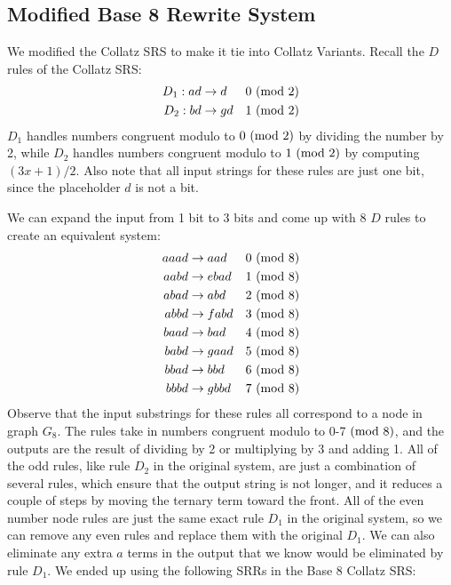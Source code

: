 \subsection{Modified Base 8 Rewrite System} \label{subsec:base8rewrite}
We modified the Collatz SRS to make it tie into Collatz Variants. Recall the $D$ rules of the Collatz SRS:
\begin{align*}
    D_1: ad &\rightarrow d &\text{$0\ (\mathrm{mod}\ 2)$}\\
    D_2: bd &\rightarrow gd &\text{$1\ (\mathrm{mod}\ 2)$}\\
\end{align*}
$D_1$ handles numbers congruent modulo to $0 \ (\mathrm{mod}\ 2)$ by dividing the number by 2, while $D_2$ handles numbers congruent modulo to $1 \ (\mathrm{mod}\ 2)$  by computing $(3x+1)/2$. Also note that all input strings for these rules are just one bit, since the placeholder $d$ is not a bit.\par
We can expand the input from 1 bit to 3 bits and come up with 8 $D$ rules to create an equivalent system:
\begin{align*}
    aaad &\rightarrow aad &\text{$0\ (\mathrm{mod}\ 8)$}\\
    aabd &\rightarrow ebad &\text{$1\ (\mathrm{mod}\ 8)$}\\
    abad &\rightarrow abd &\text{$2\ (\mathrm{mod}\ 8)$}\\
    abbd &\rightarrow fabd &\text{$3\ (\mathrm{mod}\ 8)$}\\
    baad &\rightarrow bad &\text{$4\ (\mathrm{mod}\ 8)$}\\
    babd &\rightarrow gaad &\text{$5\ (\mathrm{mod}\ 8)$}\\
    bbad &\rightarrow bbd &\text{$6\ (\mathrm{mod}\ 8)$}\\
    bbbd &\rightarrow gbbd &\text{$7\ (\mathrm{mod}\ 8)$}
\end{align*}
Observe that the input substrings for these rules all correspond to a node in graph $G_8$. The rules take in numbers congruent modulo to 0-7$\ (\mathrm{mod}\ 8)$, and the outputs are the result of dividing by 2 or multiplying by 3 and adding 1. All of the odd rules, like rule $D_2$ in the original system, are just a combination of several rules, which ensure that the output string is not longer, and it reduces a couple of steps by moving the ternary term toward the front. All of the even number node rules are just the same exact rule $D_1$ in the original system, so we can remove any even rules and replace them with the original $D_1$. We can also eliminate any extra $a$ terms in the output that we know would be eliminated by rule $D_1$. We ended up using the following SRRs in the Base 8 Collatz SRS:
